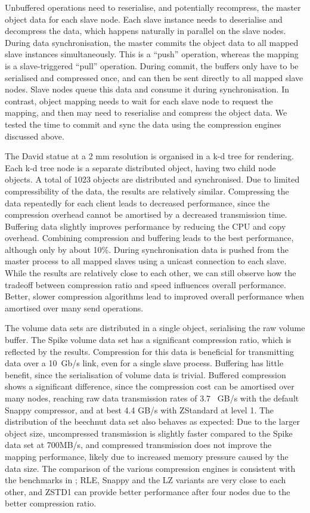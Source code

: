 Unbuffered operations need to reserialise, and potentially recompress, the
master object data for each slave node. Each slave instance needs to
deserialise and decompress the data, which happens naturally in parallel on the
slave nodes. During data synchronisation, the master commits the object data to
all mapped slave instances simultaneously. This is a “push” operation, whereas
the mapping is a slave-triggered “pull” operation. During commit, the buffers
only have to be serialised and compressed once, and can then be sent directly
to all mapped slave nodes. Slave nodes queue this data and consume it during
synchronisation. In contrast, object mapping needs to wait for each slave node
to request the mapping, and then may need to reserialise and compress the
object data. We tested the time to commit and sync the data using the compression
engines discussed above.

The David statue at a 2 mm resolution is organised in a k-d tree for rendering.
Each k-d tree node is a separate distributed object, having two child node
objects. A total of 1023 objects are distributed and synchronised. Due to
limited compressibility of the data, the results are relatively similar.
Compressing the data repeatedly for each client leads to decreased performance,
since the compression overhead cannot be amortised by a decreased
transmission time. Buffering data slightly improves performance by reducing the
CPU and copy overhead. Combining compression and buffering leads to the best
performance, although only by about 10\%. During synchronisation data is
pushed from the master process to all mapped slaves using a unicast connection
to each slave. While the results are relatively close to each other, we can
still observe how the tradeoff between compression ratio and speed influences
overall performance. Better, slower compression algorithms lead to improved
overall performance when amortised over many send operations.

The volume data sets are distributed in a single object, serialising the raw
volume buffer. The Spike volume data set has a significant compression ratio,
which is reflected by the results. Compression for this data is beneficial for
transmitting data over a 10~Gb/s link, even for a single slave process.
Buffering has little benefit, since the serialisation of volume data is trivial.
Buffered compression shows a significant difference, since the compression cost
can be amortised over many nodes, reaching raw data transmission rates of 3.7~
GB/s with the default Snappy compressor, and at best 4.4 GB/s with ZStandard at
level 1. The distribution of the beechnut data set also behaves as expected:
Due to the larger object size, uncompressed transmission is slightly faster
compared to the Spike data set at 700MB/s, and compressed transmission does not
improve the mapping performance, likely due to increased memory pressure caused
by the data size. The comparison of the various compression engines is
consistent with the benchmarks in ; RLE, Snappy and the
LZ variants are very close to each other, and ZSTD1 can provide better
performance after four nodes due to the better compression ratio.

